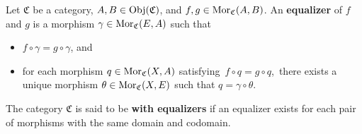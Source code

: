 \begin{definition}
\begin{itemize}
\begin{itemize}
\begin{center}
		\end{center}
	\end{itemize}
\end{itemize}
\end{definition}


\vskip 0.5cm
\begin{definition}[Equalizer]
\mbox{}
\vskip 0.1cm
\noindent
Let $\mathfrak{C}$ be a category, $A, B \in \textnormal{Obj}(\mathfrak{C})$, and $f, g \in \textnormal{Mor}_{\mathfrak{C}}(A,B)$.
\vskip 0.1cm
\noindent
An \textbf{equalizer} of $f$ and $g$ is a morphism $\gamma \in \textnormal{Mor}_{\mathfrak{C}}(E,A)$ such that
\begin{itemize}
\item
	$f \circ \gamma = g \circ \gamma$, and
\item
	for each morphism $q \in \textnormal{Mor}_{\mathfrak{C}}(X,A)$ satisfying \,$f \circ q = g \circ q$,\,
	there exists a unique morphism $\theta \in \textnormal{Mor}_{\mathfrak{C}}(X,E)$ such that
	$q = \gamma \circ \theta$.
	\begin{center}
	\end{center}
\end{itemize}
The category $\mathfrak{C}$ is said to be \textbf{with equalizers}
if an equalizer exists for each pair of morphisms with the same domain and codomain.
\end{definition}

